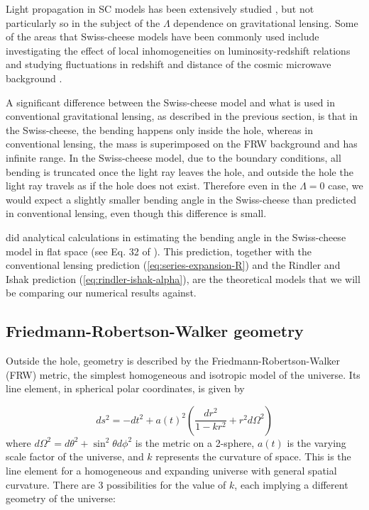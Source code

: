 Light propagation in SC models has been extensively studied \citep{szybka2011light,vanderveld2008luminosity,fleury2014swiss}, but not particularly so in the subject of the $\Lambda$ dependence on gravitational lensing. Some of the areas that Swiss-cheese models have been commonly used include investigating the effect of local inhomogeneities on luminosity-redshift relations \citep{kantowski1969corrections,fleury2013interpretation} and studying fluctuations in redshift and distance of the cosmic microwave background \citep{bolejko2009szekeres,valkenburg2009swiss,bolejko2011effect}. 

A significant difference between the Swiss-cheese model and what is used in conventional gravitational lensing, as described in the previous section, is that in the Swiss-cheese, the bending happens only inside the hole, whereas in conventional lensing, the mass is superimposed on the FRW background and has infinite range. In the Swiss-cheese model, due to the boundary conditions, all bending is truncated once the light ray leaves the hole, and outside the hole the light ray travels as if the hole does not exist. Therefore even in the $\Lambda = 0$ case, we would expect a slightly smaller bending angle in the Swiss-cheese than predicted in conventional lensing, even though this difference is small. 

\citet{kantowski2010gravitational} did analytical calculations in estimating the bending angle in the Swiss-cheese model in flat space (see Eq. 32 of \citet{kantowski2010gravitational}). This prediction, together with the conventional lensing prediction (\autoref{eq:series-expansion-R}) and the Rindler and Ishak prediction (\autoref{eq:rindler-ishak-alpha}), are the theoretical models that we will be comparing our numerical results against. 


\subsection{Friedmann-Robertson-Walker geometry}

Outside the hole, geometry is described by the Friedmann-Robertson-Walker (FRW) metric, the simplest homogeneous and isotropic model of the universe. Its line element, in spherical polar coordinates, is given by \citep{wald2010general}

\begin{equation}
  ds^2 = -dt^2 + a(t)^2 \left ( \frac{dr^2}{1-kr^2} + r^2 d \Omega^2 \right )
  \label{eq:frw-metric}
\end{equation}
where $d \Omega^2 = d\theta^2 + \sin^2\theta d\phi^2$ is the metric on a 2-sphere, $a(t)$ is the varying scale factor of the universe, and $k$ represents the curvature of space. This is the line element for a homogeneous and expanding universe with general spatial curvature. There are 3 possibilities for the value of $k$, each implying a different geometry of the universe:

